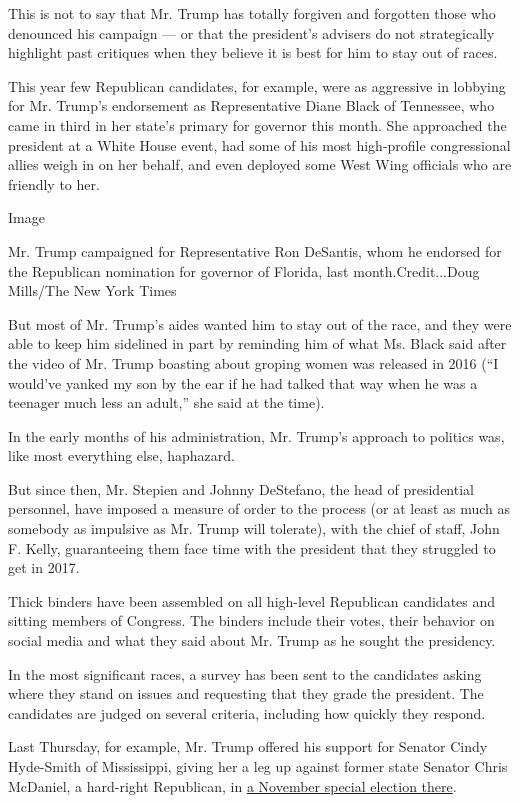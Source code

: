 This is not to say that Mr. Trump has totally forgiven and forgotten
those who denounced his campaign --- or that the president's advisers do
not strategically highlight past critiques when they believe it is best
for him to stay out of races.

This year few Republican candidates, for example, were as aggressive in
lobbying for Mr. Trump's endorsement as Representative Diane Black of
Tennessee, who came in third in her state's primary for governor this
month. She approached the president at a White House event, had some of
his most high-profile congressional allies weigh in on her behalf, and
even deployed some West Wing officials who are friendly to her.

Image

Mr. Trump campaigned for Representative Ron DeSantis, whom he endorsed
for the Republican nomination for governor of Florida, last
month.Credit...Doug Mills/The New York Times

But most of Mr. Trump's aides wanted him to stay out of the race, and
they were able to keep him sidelined in part by reminding him of what
Ms. Black said after the video of Mr. Trump boasting about groping women
was released in 2016 (``I would've yanked my son by the ear if he had
talked that way when he was a teenager much less an adult,'' she said at
the time).

In the early months of his administration, Mr. Trump's approach to
politics was, like most everything else, haphazard.

But since then, Mr. Stepien and Johnny DeStefano, the head of
presidential personnel, have imposed a measure of order to the process
(or at least as much as somebody as impulsive as Mr. Trump will
tolerate), with the chief of staff, John F. Kelly, guaranteeing them
face time with the president that they struggled to get in 2017.

Thick binders have been assembled on all high-level Republican
candidates and sitting members of Congress. The binders include their
votes, their behavior on social media and what they said about Mr. Trump
as he sought the presidency.

In the most significant races, a survey has been sent to the candidates
asking where they stand on issues and requesting that they grade the
president. The candidates are judged on several criteria, including how
quickly they respond.

Last Thursday, for example, Mr. Trump offered his support for Senator
Cindy Hyde-Smith of Mississippi, giving her a leg up against former
state Senator Chris McDaniel, a hard-right Republican, in
\href{https://www.nytimes3xbfgragh.onion/2018/06/01/us/politics/chris-mcdaniel-mississippi-trump.html}{a
November special election there}.


